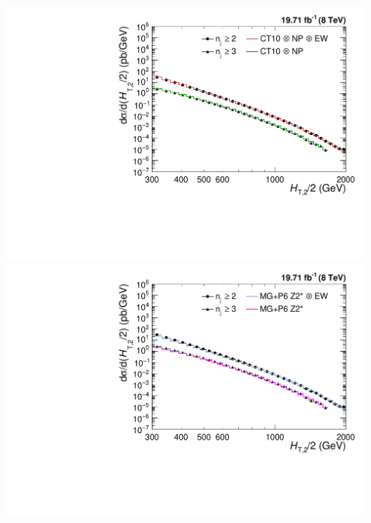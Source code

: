 \documentclass{beamer}
\begin{document}
\begin{frame}
\begin{minipage}[tbp]{0.6\textwidth}
\begin{center}
\end{center}
\end{minipage}
\begin{minipage}[tbp]{0.3\textwidth}
\includegraphics[scale = 0.24]{Plots_HT_2_150/Comparison_data_theory_EW.pdf}\\
\vspace{1mm}
\includegraphics[scale = 0.24]{Plots_HT_2_150/Comparison_data_MC_EW.pdf}%
\end{minipage}
\end{frame}
\ball
\end{document}
